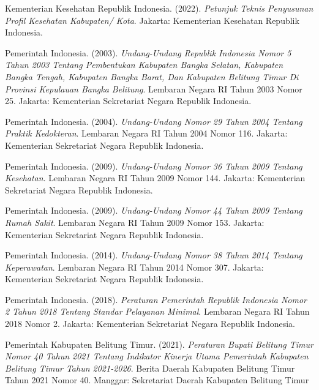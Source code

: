     Kementerian Kesehatan Republik Indonesia. (2022). \emph{Petunjuk Teknis Penyusunan Profil Kesehatan Kabupaten/ Kota}. Jakarta: Kementerian Kesehatan Republik Indonesia.

    Pemerintah Indonesia. (2003). \emph{Undang-Undang Republik Indonesia Nomor 5 Tahun 2003 Tentang Pembentukan Kabupaten Bangka Selatan, Kabupaten Bangka Tengah, Kabupaten Bangka Barat, Dan Kabupaten Belitung Timur Di Provinsi Kepulauan Bangka Belitung}. Lembaran Negara RI Tahun 2003 Nomor 25. Jakarta: Kementerian Sekretariat Negara Republik Indonesia.
    
    Pemerintah Indonesia. (2004). \emph{Undang-Undang Nomor 29 Tahun 2004 Tentang Praktik Kedokteran}. Lembaran Negara RI Tahun 2004 Nomor 116. Jakarta: Kementerian Sekretariat Negara Republik Indonesia.

    Pemerintah Indonesia. (2009). \emph{Undang-Undang Nomor 36 Tahun 2009 Tentang Kesehatan}. Lembaran Negara RI Tahun 2009 Nomor 144. Jakarta: Kementerian Sekretariat Negara Republik Indonesia.

    Pemerintah Indonesia. (2009). \emph{Undang-Undang Nomor 44 Tahun 2009 Tentang Rumah Sakit}. Lembaran Negara RI Tahun 2009 Nomor 153. Jakarta: Kementerian Sekretariat Negara Republik Indonesia.
    
    Pemerintah Indonesia. (2014). \emph{Undang-Undang Nomor 38 Tahun 2014 Tentang Keperawatan}. Lembaran Negara RI Tahun 2014 Nomor 307. Jakarta: Kementerian Sekretariat Negara Republik Indonesia.
    
    Pemerintah Indonesia. (2018). \emph{Peraturan Pemerintah Republik Indonesia Nomor 2 Tahun 2018 Tentang Standar Pelayanan Minimal}. Lembaran Negara RI Tahun 2018 Nomor 2. Jakarta: Kementerian Sekretariat Negara Republik Indonesia.
    
    Pemerintah Kabupaten Belitung Timur. (2021). \emph{Peraturan Bupati Belitung Timur Nomor 40 Tahun 2021 Tentang Indikator Kinerja Utama Pemerintah Kabupaten Belitung Timur Tahun 2021-2026}. Berita Daerah Kabupaten Belitung Timur Tahun 2021 Nomor 40. Manggar: Sekretariat Daerah Kabupaten Belitung Timur

